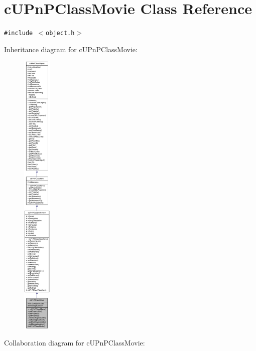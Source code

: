 \hypertarget{classcUPnPClassMovie}{
\section{cUPnPClassMovie Class Reference}
\label{classcUPnPClassMovie}
}
{\tt \#include $<$object.h$>$}

Inheritance diagram for cUPnPClassMovie:\nopagebreak
\begin{figure}[H]
\begin{center}
\leavevmode
\includegraphics[height=400pt]{classcUPnPClassMovie__inherit__graph}
\end{center}
\end{figure}
Collaboration diagram for cUPnPClassMovie:\nopagebreak
